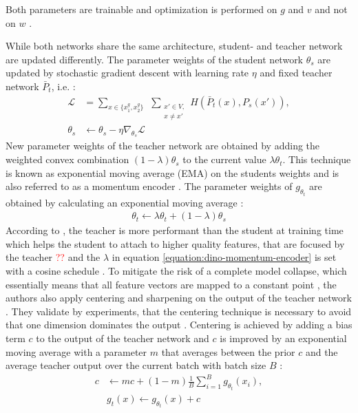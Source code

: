 Both parameters are trainable and optimization is performed on $g$ and $v$ and not on $w$ \citep{Salimans2016}.
\par
While both networks share the same architecture, student- and teacher network are updated differently. 
The parameter weights of the student network $\theta_s$ are updated by stochastic gradient descent with learning rate $\eta$ and fixed teacher network $\bar{P}_t$, i.e. \citep{Caron2021}:
\begin{align}
	\mathcal{L}  &= \sum_{x \in \{x_1^g, x_2^g\}} \hspace{5pt} \sum_{\substack{ x\prime \in V, \\ x\neq x\prime}} H(\bar P_t(x),P_s(x\prime)), \\ 
	\theta_s &\leftarrow \theta_s - \eta \nabla_{\theta_s} \mathcal{L}
\end{align}
New parameter weights of the teacher network are obtained by adding the weighted convex combination $(1-\lambda)\theta_s$ to the current value $\lambda\theta_t$.
This technique is known as exponential moving average (EMA) on the students weights and is also referred to as a momentum encoder \citep{He2019,Caron2021}.
The parameter weights of $g_{\theta_t}$ are obtained by calculating an exponential moving average \citep{Grill2020,Caron2021}: 
\begin{align}
	\theta_t \leftarrow \lambda \theta_t + (1-\lambda) \theta_s
	\label{equation:dino-momentum-encoder}
\end{align}
According to \citep{Caron2021}, the teacher is more performant than the student at training time which helps the student to attach to higher quality features, that are focused by the teacher \textcolor{red}{??} and the $\lambda$ in equation \ref{equation:dino-momentum-encoder} is set with a cosine schedule \citep{Grill2020}.
To mitigate the risk of a complete model collapse, which essentially means that all feature vectors are mapped to a constant point \citep{Jing2022}, the authors also apply centering and sharpening on the output of the teacher network \citep{Caron2021}.
They validate by experiments, that the centering technique is necessary to avoid that one dimension dominates the output \citep{Caron2021}.
Centering is achieved by adding a bias term $c$ to the output of the teacher network and $c$ is improved by an exponential moving average with a parameter $m$ that averages between the prior $c$ and the average teacher output over the current batch with batch size $B$ \citep{Caron2021}:
\begin{align}
	c & \leftarrow mc + (1-m) \frac{1}{B}\sum_{i=1}^B g_{\theta_t}(x_i), \\
	& g_t(x) \leftarrow g_{\theta_t}(x) + c
	\label{equation:dino-centering}
\end{align}
